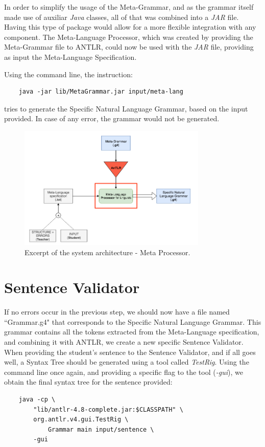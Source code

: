 In order to simplify the usage of the Meta-Grammar, and as the grammar itself made use of auxiliar \emph{Java} classes, all of that was combined into a \emph{JAR} file.
Having this type of package would allow for a more flexible integration with any component.
The Meta-Language Processor, which was created by providing the Meta-Grammar file to ANTLR, could now be used with the \emph{JAR} file, 
providing as input the Meta-Language Specification. 

\noindent Using the command line, the instruction:
\begin{Verbatim}
	java -jar lib/MetaGrammar.jar input/meta-lang
\end{Verbatim}
\noindent tries to generate the Specific Natural Language Grammar, based on the input provided. In case of any error, the grammar would not be generated.

\begin{figure}[h]
    \centering
    \includegraphics[width=9cm]{images/system_meta_processor.png}
    \caption{Excerpt of the system architecture - Meta Processor.}
    \label{fig:system_architecture}
\end{figure}

\newpage
\section{Sentence Validator}

If no errors occur in the previous step, we should now have a file named ``Grammar.g4" that corresponds to the Specific Natural Language Grammar.
This grammar contains all the tokens extracted from the Meta-Language specification, and combining it with ANTLR, we create a new specific Sentence Validator.
When providing the student's sentence to the Sentence Validator, and if all goes well, a Syntax Tree should be generated using a tool called \emph{TestRig}.
Using the command line once again, and providing a specific flag to the tool (\emph{-gui}), we obtain the final syntax tree for the sentence provided: 
\begin{Verbatim}
	java -cp \ 
		"lib/antlr-4.8-complete.jar:$CLASSPATH" \ 
		org.antlr.v4.gui.TestRig \ 
			Grammar main input/sentence \ 
		-gui
\end{Verbatim}

